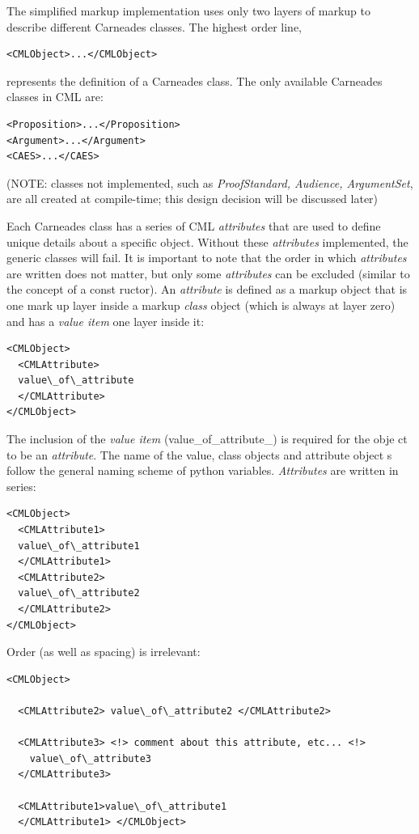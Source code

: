\documentclass[10pt,a4paper,twocolumn]{article}
\begin{document}
The simplified markup implementation uses only two layers of markup to describe different Carneades classes. The highest order line,

\begin{lstlisting}
<CMLObject>...</CMLObject>
\end{lstlisting}

represents the definition of a Carneades class. The only available Carneades classes in CML are:

\begin{lstlisting}
<Proposition>...</Proposition>
<Argument>...</Argument>
<CAES>...</CAES>
\end{lstlisting}

(NOTE: classes not implemented, such as \textit{ProofStandard, Audience, ArgumentSet}, 
are all created at compile-time; this design decision will be discussed later)

Each Carneades class has a series of CML \textit{attributes} that are used to define 
unique details about a specific object. Without these \textit{attributes} 
implemented, the generic classes will fail. It is important to note that 
the order in which \textit{attributes} are written does not matter, but only 
some \textit{attributes} can be excluded (similar to the concept of a const
ructor). An \textit{attribute} is defined as a markup object that is one mark
up layer inside a markup \textit{class} object (which is always at layer zero) 
and has a \textit{value item} one layer inside it:

\begin{lstlisting}
<CMLObject>
  <CMLAttribute>
  value\_of\_attribute
  </CMLAttribute>
</CMLObject>
\end{lstlisting}

The inclusion of the \textit{value item} (value\_of\_attribute\_) is required for the obje
ct to be an \textit{attribute}. The name of the value, class objects and attribute object
s follow the general naming scheme of python variables. \textit{Attributes} are written in series:

\begin{lstlisting}
<CMLObject>
  <CMLAttribute1>
  value\_of\_attribute1
  </CMLAttribute1>
  <CMLAttribute2>
  value\_of\_attribute2
  </CMLAttribute2>
</CMLObject>
\end{lstlisting}

Order (as well as spacing) is irrelevant:

\begin{lstlisting}
<CMLObject>

  <CMLAttribute2> value\_of\_attribute2 </CMLAttribute2>

  <CMLAttribute3> <!> comment about this attribute, etc... <!>
    value\_of\_attribute3
  </CMLAttribute3>

  <CMLAttribute1>value\_of\_attribute1
  </CMLAttribute1> </CMLObject>
\end{lstlisting}
\end{document}
